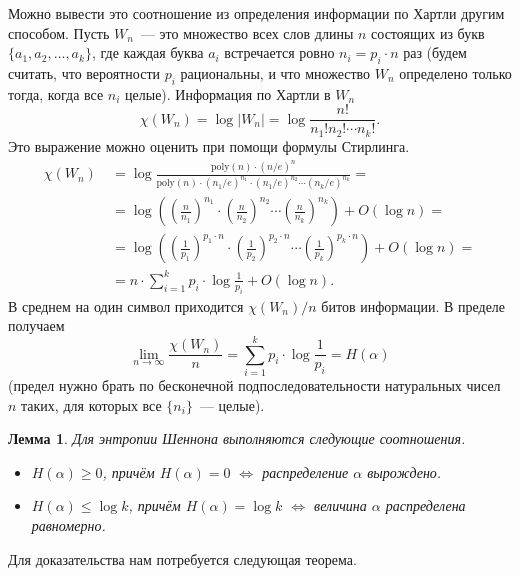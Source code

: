 \documentclass[12pt]{article}
\newcommand{\seqn}[2]{{#1}_1,{#1}_2,\dotsc,{#1}_{#2}}
\newcommand{\poly}{\mathrm{poly}}
\theoremstyle{definition}
\theoremstyle{plain}
\newtheorem{lemma}{Лемма}[section]
\theoremstyle{remark}
\begin{document}
Можно вывести это соотношение из определения информации по Хартли другим способом. 
Пусть $W_n$~--- это множество всех слов длины $n$ состоящих из букв $\{\seqn{a}{k}\}$,
где каждая буква $a_i$ встречается ровно $n_i = p_i\cdot n$ раз
(будем считать, что вероятности $p_i$ рациональны, и что множество 
$W_n$ определено только тогда, когда все $n_i$ целые).
Информация по Хартли в $W_n$ 
\[
    \chi(W_n) = \log |W_n| = \log \frac{n!}{n_1!n_2!\dotsb n_k!}.
\]
Это выражение можно оценить при помощи формулы Стирлинга.
\[
    \begin{aligned}
    \chi(W_n)&\ =  \log \frac{\poly(n)\cdot (n/e)^n}
    {\poly(n)\cdot(n_1/e)^{n_1}\cdot(n_1/e)^{n_2}\dotsm(n_k/e)^{n_k}} =\\
    &\ = \log \left(\left(\frac{n}{n_1}\right)^{n_1}\cdot
                    \left(\frac{n}{n_2}\right)^{n_2}\dotsm
                    \left(\frac{n}{n_k}\right)^{n_k}\right) + O(\log n) =\\
    &\ = \log \left(\left(\frac{1}{p_1}\right)^{p_1\cdot n}\cdot
                    \left(\frac{1}{p_2}\right)^{p_2\cdot n}\dotsm
                    \left(\frac{1}{p_k}\right)^{p_k\cdot n}\right) + O(\log n) =\\
    &\ = n \cdot \sum_{i=1}^k p_i \cdot \log\frac{1}{p_i} + O(\log n).
    \end{aligned}
\]
В среднем на один символ приходится $\chi(W_n)/n$ битов информации.
В пределе получаем
\[
    \lim_{n\to \infty}\frac{\chi(W_n)}{n} = \sum_{i=1}^k p_i \cdot \log\frac{1}{p_i} = H(\alpha)
\]
(предел нужно брать по бесконечной подпоследовательности натуральных чисел $n$ таких,
для которых все $\{n_i\}$~--- целые).
 

\begin{lemma}\label{lm:entropy-properties}
Для энтропии Шеннона выполняются следующие соотношения.
\begin{itemize}
\item \(H(\alpha) \ge 0\), причём \(H(\alpha) = 0\) \(\iff\) распределение \(\alpha\) вырождено.

\item \(H(\alpha) \le \log k\), причём \(H(\alpha) = \log k\) \(\iff\) величина \(\alpha\) распределена равномерно.

\end{itemize}
\end{lemma}

Для доказательства нам потребуется следующая теорема.
\end{document}
